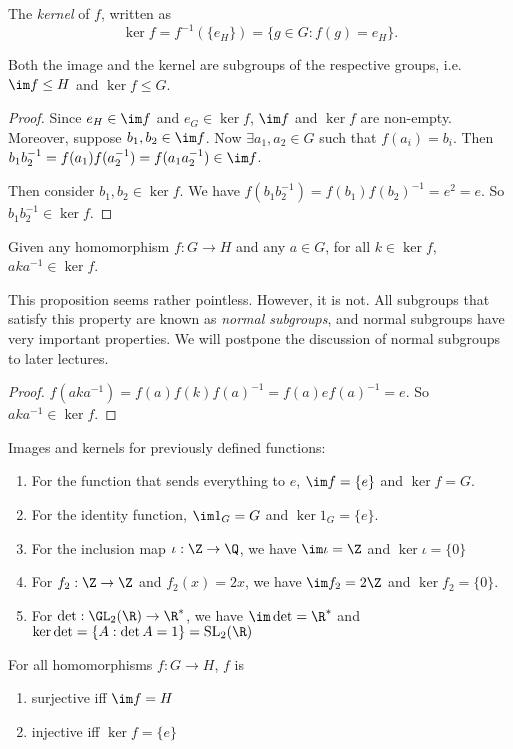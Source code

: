 \documentclass[a4paper]{article}
\begin{document}
\begin{defi}
  The \emph{kernel} of $f$, written as
  \[
    \ker f = f^{-1}(\{e_H\}) = \{g\in G:f(g)=e_H\}.
  \]
\end{defi}

\begin{prop}
  Both the image and the kernel are subgroups of the respective groups, i.e.\ $\im f\leq H$ and $\ker f \leq G$.
\end{prop}

\begin{proof}
  Since $e_H\in \im f$ and $e_G\in \ker f$, $\im f$ and $\ker f$ are non-empty. Moreover, suppose $b_1, b_2\in \im f$. Now $\exists a_1, a_2 \in G$ such that $f(a_i) = b_i$. Then $b_1b_2^{-1} = f(a_1)f(a_2^{-1}) = f(a_1a_2^{-1})\in \im f$.

  Then consider $b_1,b_2\in \ker f$. We have $f(b_1b_2^{-1}) = f(b_1)f(b_2)^{-1} = e^2 = e$. So $b_1b_2^{-1}\in \ker f$.
\end{proof}

\begin{prop}
  Given any homomorphism $f:G\rightarrow H$ and any $a\in G$, for all $k\in \ker f$, $aka^{-1}\in\ker f$.
\end{prop}
This proposition seems rather pointless. However, it is not. All subgroups that satisfy this property are known as \emph{normal subgroups}, and normal subgroups have very important properties. We will postpone the discussion of normal subgroups to later lectures.

\begin{proof}
  $f(aka^{-1}) = f(a)f(k)f(a)^{-1} = f(a)ef(a)^{-1} = e$. So $aka^{-1}\in \ker f$.
\end{proof}

\begin{eg}
  Images and kernels for previously defined functions:
  \begin{enumerate}
    \item For the function that sends everything to $e$, $\im f = \{e\}$ and $\ker f = G$.
    \item For the identity function, $\im 1_G = G$ and $\ker 1_G = \{e\}$.
    \item For the inclusion map $\iota: \Z\rightarrow\Q$, we have $\im \iota = \Z$ and $\ker \iota = \{0\}$
    \item For $f_2:\Z\rightarrow\Z$ and $f_2(x) = 2x$, we have $\im f_2 = 2\Z$ and $\ker f_2 = \{0\}$.
    \item For $\det: \GL_2(\R) \rightarrow \R^*$, we have $\im \det = \R^*$ and $\ker \det = \{A:\det A = 1\} = \mathrm{SL}_2(\R)$
  \end{enumerate}
\end{eg}
\begin{prop}
  For all homomorphisms $f:G\rightarrow H$, $f$ is
  \begin{enumerate}
    \item surjective iff $\im f = H$
    \item injective iff $\ker f = \{e\}$
  \end{enumerate}
\end{prop}
\end{document}
